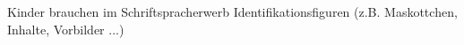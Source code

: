 Kinder brauchen im Schriftspracherwerb Identifikationsfiguren (z.B. Maskottchen, Inhalte, Vorbilder ...)